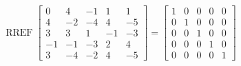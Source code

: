 \begin{exerciseAnswer} 


\[\operatorname{RREF} \left[\begin{array}{ccccc}
0 & 4 & -1 & 1 & 1 \\
4 & -2 & -4 & 4 & -5 \\
3 & 3 & 1 & -1 & -3 \\
-1 & -1 & -3 & 2 & 4 \\
3 & -4 & -2 & 4 & -5
\end{array}\right] = \left[\begin{array}{ccccc}
1 & 0 & 0 & 0 & 0 \\
0 & 1 & 0 & 0 & 0 \\
0 & 0 & 1 & 0 & 0 \\
0 & 0 & 0 & 1 & 0 \\
0 & 0 & 0 & 0 & 1
\end{array}\right] \]



\end{exerciseAnswer}
